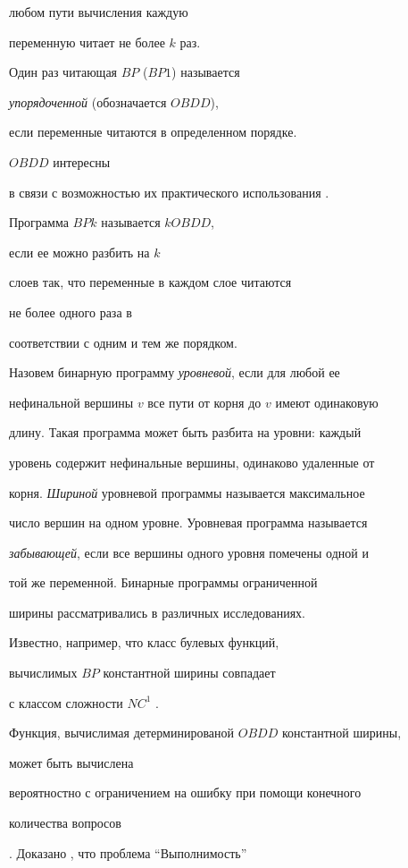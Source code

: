 любом пути вычисления каждую


переменную читает не более $k$ раз.


Один раз читающая $BP$ ($BP1$) называется


{\em упорядоченной} (обозначается $OBDD$),


если переменные читаются в определенном порядке.


$OBDD$ интересны


в связи с возможностью их практического использования \cite{Br86}.


Программа $BPk$ называется $kOBDD$,


если ее можно разбить на $k$


слоев так, что переменные в каждом слое читаются


не более одного раза в


соответствии с одним и тем же порядком.





Назовем бинарную программу {\it уровневой}, если для любой ее


нефинальной вершины $v$ все пути от корня до $v$ имеют одинаковую


длину. Такая программа может быть разбита на уровни: каждый


уровень содержит нефинальные вершины, одинаково удаленные от


корня. {\it Шириной} уровневой программы называется максимальное


число вершин на одном уровне. Уровневая программа называется


{\it забывающей}, если все вершины одного уровня помечены одной и


той же переменной. Бинарные программы ограниченной


ширины рассматривались в различных исследованиях.


Известно, например, что класс булевых функций,


вычислимых $BP$ константной ширины совпадает


с классом сложности $NC^1$ \cite{Ba86}.


Функция, вычислимая детерминированой $OBDD$ константной ширины,


может быть вычислена


вероятностно с ограничением на ошибку при помощи конечного


количества вопросов


\cite{N00}. Доказано \cite{AT}, что проблема ``Выполнимость''


